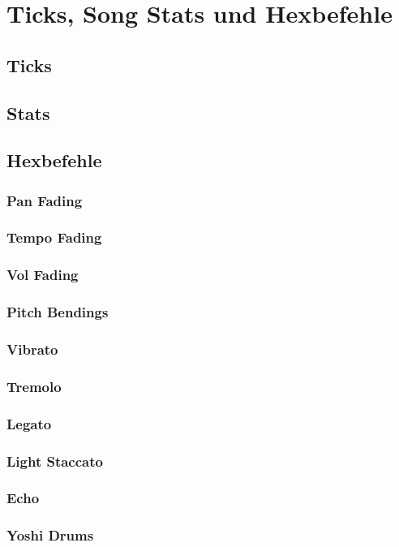 \section{Ticks, Song Stats und Hexbefehle}

\subsection{Ticks}
\subsection{Stats}
\subsection{Hexbefehle}
\subsubsection{Pan Fading}
\subsubsection{Tempo Fading}
\subsubsection{Vol Fading}
\subsubsection{Pitch Bendings}
\subsubsection{Vibrato}
\subsubsection{Tremolo}
\subsubsection{Legato}
\subsubsection{Light Staccato}
\subsubsection{Echo}
\subsubsection{Yoshi Drums}